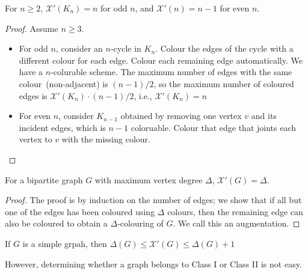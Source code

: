 \begin{theorem}
For $n\ge2$, $\mathcal{X}'(K_n)=n$ for odd $n$,
and $\mathcal{X}'(n)=n-1$ for even $n$.
\end{theorem}
\begin{proof}
Assume $n\ge3$.
\begin{itemize}
\item
For odd $n$, consider an $n$-cycle in $K_n$. Colour the edges of the cycle with a different colour for each edge. Colour each remaining edge automatically. We have a $n$-colurable scheme.
The maximum number of edges with the same colour~(non-adjacent) is $(n-1)/2$, so the maximum number of coloured edges is $\mathcal{X}'(K_n)\cdot (n-1)/2$, i.e., $\mathcal{X}'(K_n)=n$
\item
For even $n$, consider $K_{n-1}$ obtained by removing one vertex $v$ and its incident edges, which is $n-1$ coloruable. Colour that edge that joints each vertex to $v$ with the missing colour.
\end{itemize}
\end{proof}

\begin{theorem}
For a bipartite graph $G$ with maximum vertex degree $\Delta$, $\mathcal{X}'(G)=\Delta$.
\end{theorem}
\begin{proof}
The proof is by induction on the number of edges; we show that if all but one of the edges has been coloured using $\Delta$ colours, then the remaining edge can also be coloured to obtain a $\Delta$-colouring of $G$. We call this an augmentation.
\end{proof}

\begin{theorem}
If $G$ is a simple grpah, then $\Delta(G)\le\mathcal{X}'(G)\le\Delta(G)+1$
\end{theorem}
However, determining whether a graph belongs to Class I or Class II is not easy.














